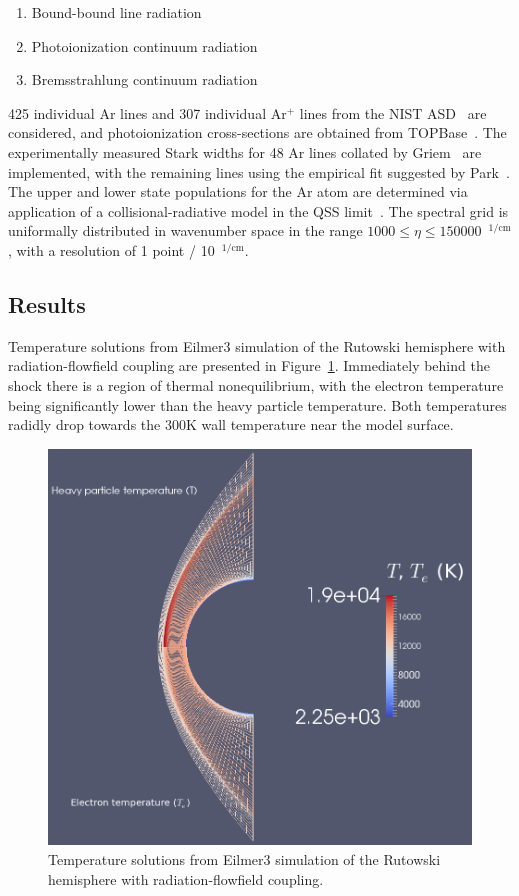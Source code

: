 \begin{enumerate}
 \item Bound-bound line radiation
 \item Photoionization continuum radiation
 \item Bremsstrahlung continuum radiation
\end{enumerate}

425 individual Ar lines and 307 individual Ar$^+$ lines from the NIST ASD~\cite{NIST_ASD} are considered, and  photoionization cross-sections are obtained from TOPBase~\cite{TOPbase}.
The experimentally measured Stark widths for 48 Ar lines collated by Griem~\cite{Griem74} are implemented, with the remaining lines using the empirical fit suggested by Park~\cite{Park82}.
The upper and lower state populations for the Ar atom are determined via application of a collisional-radiative model in the QSS limit~\cite{park_1990}.
The spectral grid is uniformally distributed in wavenumber space in the range $1000 \leq \eta \leq 150000$~$^{1/\text{cm}}$, with a resolution of 1 point / 10~$^{1/\text{cm}}$.

\subsection{Results}

Temperature solutions from Eilmer3 simulation of the Rutowski hemisphere with radiation-flowfield coupling are presented in Figure~\ref{fig:rutowskiTemperature}.
Immediately behind the shock there is a region of thermal nonequilibrium, with the electron temperature being significantly lower than the heavy particle temperature.
Both temperatures radidly drop towards the 300K wall temperature near the model surface.

\begin{figure}
 \centering
 \includegraphics[width=0.7\linewidth]{../2D/Rutowski-hemisphere/figures/temperature.png}
 \caption{Temperature solutions from Eilmer3 simulation of the Rutowski hemisphere with radiation-flowfield coupling.}
 \label{fig:rutowskiTemperature}
\end{figure}

